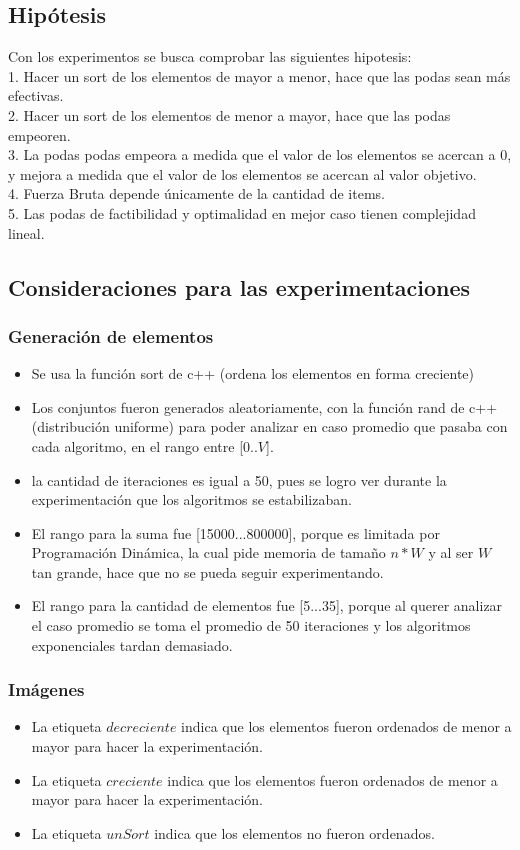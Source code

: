\subsection{Hip\'otesis}
	Con los experimentos se busca comprobar las siguientes hipotesis:\\
	1. Hacer un sort de los elementos de mayor a menor, hace que las podas sean m\'as efectivas.\\
	2. Hacer un sort de los elementos de menor a mayor, hace que las podas empeoren.\\
	3. La podas podas empeora a medida que el valor de los elementos se acercan a 0, y mejora a medida que el valor de los elementos se acercan al valor objetivo.\\
	4. Fuerza Bruta depende únicamente de la cantidad de items.\\
	5. Las podas de factibilidad y optimalidad en mejor caso tienen complejidad lineal.\\
\subsection{Consideraciones para las experimentaciones}
\subsubsection{Generaci\'on de elementos}
\begin{itemize}
	\item Se usa la función sort de c++ (ordena los elementos en forma creciente)
	\item Los conjuntos fueron generados aleatoriamente, con la funci\'on rand de c++ (distribución uniforme) para poder analizar en caso promedio que pasaba con cada algoritmo, en el rango entre [0..$V$].
	\item la cantidad de iteraciones es igual a 50, pues se logro ver durante la experimentaci\'on que los algoritmos se estabilizaban.
	\item El rango para la suma fue [15000...800000], porque es limitada por Programación Dinámica, la cual pide memoria de tamaño $n*W$ y al ser $W$ tan grande, hace que no se pueda seguir experimentando.
	\item El rango para la cantidad de elementos fue [5...35], porque al querer analizar el caso promedio se toma el promedio de 50 iteraciones y los algoritmos exponenciales tardan demasiado.
\end{itemize}
\subsubsection{Im\'agenes}
\begin{itemize}
	\item La etiqueta $decreciente$ indica que los elementos fueron ordenados de menor a mayor para hacer la experimentaci\'on.
	\item La etiqueta $creciente$ indica que los elementos fueron ordenados de menor a mayor para hacer la experimentaci\'on.
	\item La etiqueta $unSort$ indica que los elementos no fueron ordenados.
\end{itemize}	
